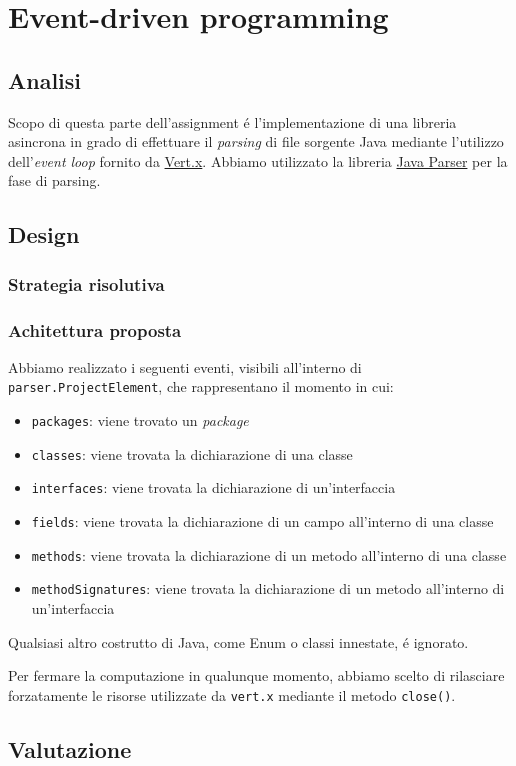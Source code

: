 \documentclass[report]{subfiles}
\begin{document}
	\section{Event-driven programming}
	\subsection{Analisi}
	Scopo di questa parte dell'assignment \'e l'implementazione di una libreria asincrona in grado di effettuare il \emph{parsing} di file sorgente Java mediante l'utilizzo dell'\emph{event loop} fornito da \href{https://vertx.io/}{Vert.x}. Abbiamo utilizzato la libreria \href{https://javaparser.org/}{Java Parser} per la fase di parsing.
	
	\subsection{Design}
	\subsubsection{Strategia risolutiva}
	\subsubsection{Achitettura proposta}
	Abbiamo realizzato i seguenti eventi, visibili all'interno di \texttt{parser.ProjectElement}, che rappresentano il momento in cui:
	\begin{itemize}
		\item \texttt{packages}: viene trovato un \emph{package}
		\item \texttt{classes}: viene trovata la dichiarazione di una classe
		\item \texttt{interfaces}: viene trovata la dichiarazione di un'interfaccia
		\item \texttt{fields}: viene trovata la dichiarazione di un campo all'interno di una classe
		\item \texttt{methods}: viene trovata la dichiarazione di un metodo all'interno di una classe
		\item \texttt{methodSignatures}: viene trovata la dichiarazione di un metodo all'interno di un'interfaccia
	\end{itemize}
	
	Qualsiasi altro costrutto di Java, come Enum o classi innestate, \'e ignorato.
	
	Per fermare la computazione in qualunque momento, abbiamo scelto di rilasciare forzatamente le risorse utilizzate da \texttt{vert.x} mediante il metodo \texttt{close()}.
	
	\subsection{Valutazione}
\end{document}
